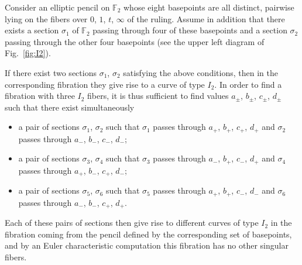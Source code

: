 \documentclass[pdftex]{sigma}
\numberwithin{equation}{section}
\begin{document}
\begin{Example}
Consider an elliptic pencil on ${\mathbb {F}}_2$ whose eight basepoints are
all distinct, pairwise lying on the fibers over $0$, $1$, $t$, $\infty $ of the
ruling. Assume in addition that there exists a section $\sigma_1$ of
${\mathbb {F}}_2$ passing through four of these basepoints and a
section $\sigma_2$ passing through the other four basepoints
(see the upper left diagram of Fig.~\ref{fig:I2}).

If there exist two sections $\sigma_1$, $\sigma_2$ satisfying the above
conditions, then in the corresponding fibration they give rise to a
curve of type $I_2$. In order to find a fibration with three
$I_2$ fibers, it is thus sufficient to find values $a_{\pm}$, $b_{\pm}$, $c_{\pm}$, $d_{\pm}$ such that there exist simultaneously
\begin{itemize}\itemsep=0pt
 \item a pair of sections $\sigma_1$, $\sigma_2$ such that $\sigma_1$
 passes through $a_+$, $b_+$, $c_+$, $d_+$ and $\sigma_2$ passes through
 $a_-$, $b_-$, $c_-$, $d_-$;
 \item a pair of sections $\sigma_3$, $\sigma_4$ such that $\sigma_3$
 passes through $a_-$, $b_+$, $c_-$, $d_+$ and $\sigma_4$ passes through $a_+$, $b_-$, $c_+$, $d_-$;
 \item a pair of sections $\sigma_5$, $\sigma_6$ such that $\sigma_5$
 passes through $a_+$, $b_+$, $c_-$, $d_-$ and $\sigma_6$ passes through $a_-$, $b_-$, $c_+$, $d_+$.
\end{itemize}
Each of these pairs of sections then give rise to different curves of type $I_2$ in the fibration coming
from the pencil defined by the corresponding set of basepoints, and by an Euler characteristic computation
this fibration has no other singular fibers.


\end{Example}
\end{document}
